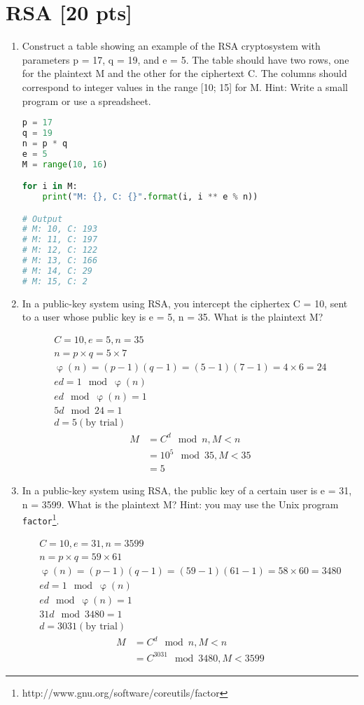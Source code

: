 \documentclass[11pt]{article}
\begin{document}
\section{RSA [20 pts] }
\begin{enumerate}
\item Construct a table showing an example of the RSA cryptosystem with parameters p = 17, q = 19, and e = 5. The table should have two rows, one for the plaintext M and the other for the ciphertext C. The columns should correspond to integer values in the range [10; 15] for M. Hint: Write a small program or use a spreadsheet.

\begin{lstlisting}[language=Python]
p = 17
q = 19
n = p * q
e = 5
M = range(10, 16)

for i in M:
    print("M: {}, C: {}".format(i, i ** e % n))

# Output
# M: 10, C: 193
# M: 11, C: 197
# M: 12, C: 122
# M: 13, C: 166
# M: 14, C: 29
# M: 15, C: 2
\end{lstlisting}

\item In a public-key system using RSA, you intercept the ciphertex C = 10, sent to a user whose public key is e = 5, n = 35. What is the plaintext M?

\begin{gather*}
  C = 10, e = 5, n = 35 \\
  n = p \times q = 5 \times 7 \\
  \upvarphi(n) = (p - 1)(q - 1) = (5 - 1)(7 - 1)= 4 \times 6 = 24 \\
  ed = 1\mod\upvarphi(n) \\
  ed\mod\upvarphi(n) = 1 \\
  5d\mod 24 = 1 \\
  d = 5 (\text{by trial})
\end{gather*}
\begin{align*}
  M &= C^{d}\mod n, M < n \\
  &= 10^{5}\mod 35, M < 35 \\
  &= 5
\end{align*}

\item In a public-key system using RSA, the public key of a certain user is e = 31, n = 3599. What is the plaintext M? Hint: you may use the Unix program \texttt{factor}\footnote{http://www.gnu.org/software/coreutils/factor}.

\begin{gather*}
  C = 10, e = 31, n = 3599 \\
  n = p \times q = 59 \times 61 \\
  \upvarphi(n) = (p - 1)(q - 1) = (59 - 1)(61 - 1)= 58 \times 60 = 3480 \\
  ed = 1\mod\upvarphi(n) \\
  ed\mod\upvarphi(n) = 1 \\
  31d\mod 3480 = 1 \\
  d = 3031 (\text{by trial})
\end{gather*}
\begin{align*}
  M &= C^{d}\mod n, M < n \\
  &= C^{3031}\mod 3480, M < 3599
\end{align*}


\end{enumerate}
\end{document}
